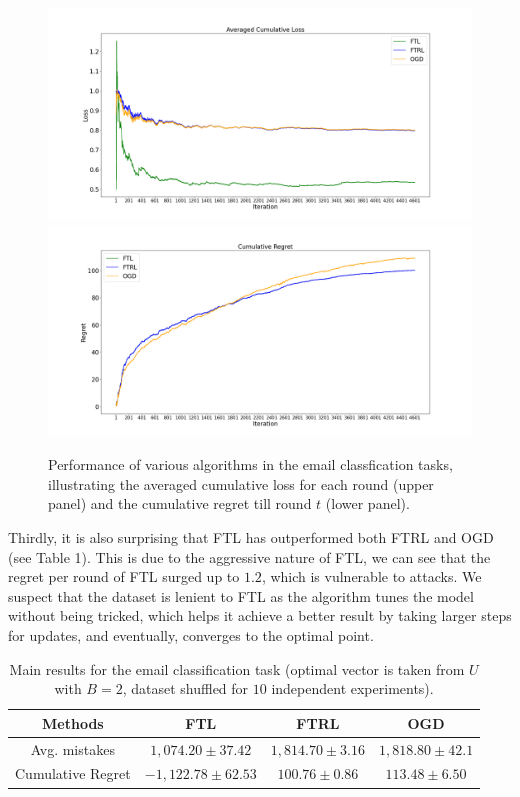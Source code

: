 \documentclass{article}
\begin{document}
\begin{figure}[H]
  \centering
  \includegraphics[width=0.6\linewidth]{../loss.png}
  \includegraphics[width=0.6\linewidth]{../regret.png}

  \caption{Performance of various algorithms in the email classfication tasks, illustrating the averaged cumulative loss for each round (upper panel) and the cumulative regret till round $t$ (lower panel).}
\end{figure}

Thirdly, it is also surprising that FTL has outperformed both FTRL and OGD (see Table 1). This is due to the aggressive nature of FTL, we can see that the regret per round of FTL surged up to $1.2$, which is vulnerable to attacks. We suspect that the dataset is lenient to FTL as the algorithm tunes the model without being tricked, which helps it achieve a better result by taking larger steps for updates, and eventually, converges to the optimal point.

\begin{table}[H]
  \centering
  \caption{Main results for the email classification task (optimal vector is taken from $U$ with $B=2$, dataset shuffled for $10$ independent experiments).}

  \begin{tabular}{c c c c}
    \toprule
    \textbf{Methods}  & \textbf{FTL}        & \textbf{FTRL}      & \textbf{OGD}      \\ \midrule
    Avg. mistakes     & $1,074.20\pm37.42$  & $1,814.70\pm 3.16$ & $1,818.80\pm42.1$ \\
    Cumulative Regret & $-1,122.78\pm62.53$ & $100.76\pm 0.86$   & $113.48\pm6.50$   \\
    \bottomrule
  \end{tabular}

\end{table}
\end{document}
